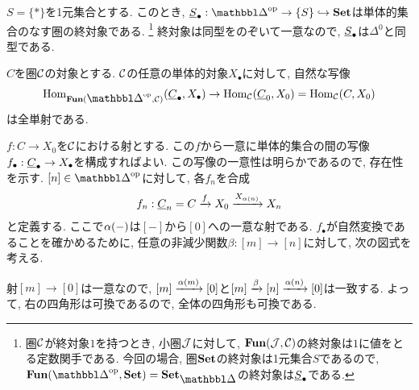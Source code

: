 \documentclass[uplatex, a4paper, 14Q, dvipdfmx]{jsreport}
\begin{document}
\begin{example}
  $S=\{\ast\}$を1元集合とする. 
  このとき, $\uline{S}_{\bullet}: \simop \to \{S\} \hookrightarrow \cset$は単体的集合のなす圏の終対象である.
  \footnote{
    圏$\mathcal{C}$が終対象$1$を持つとき, 小圏$\mathcal{J}$に対して, $\mathbf{Fun}(\mathcal{J},\mathcal{C})$の終対象は$1$に値をとる定数関手である. 
    今回の場合, 圏$\mathbf{Set}$の終対象は1元集合$S$であるので, $\fun(\simop,\cset)=\sset$の終対象は$\uline{S}_{\bullet}$である. 
  } 
  終対象は同型をのぞいて一意なので, $\uline{S}_{\bullet}$は$\Delta^0$と同型である. 
\end{example}

\begin{prop}
  $C$を圏$\mathcal{C}$の対象とする. 
  $\mathcal{C}$の任意の単体的対象$X_{\bullet}$に対して, 自然な写像
  \begin{align*}
    \Hom_{\fun(\simop,\calC)}(\uline{C}_{\bullet},X_{\bullet}) \to \Hom_{\calC}(\uline{C}_0,X_0) = \Hom_{\calC}(C,X_0)
  \end{align*}
  は全単射である.  
\end{prop}

\begin{Proof}
  $f: C \to X_0$を$\mathcal{C}$における射とする. 
  この$f$から一意に単体的集合の間の写像$f_{\bullet}: \uline{C}_{\bullet} \to X_{\bullet}$を構成すればよい. 
  この写像の一意性は明らかであるので, 存在性を示す. 
  $[n] \in \simop$に対して, 各$f_n$を合成
  \begin{align*}
    f_n: \uline{C}_n = C \xr{f} X_0 \xr{X_{\al(n)}} X_n
  \end{align*}
  と定義する. 
  ここで$\alpha(-)$は$[-]$から$[0]$への一意な射である. 
  $f_\bullet$が自然変換であることを確かめるために, 任意の非減少関数$\beta: [m] \to [n]$に対して, 次の図式を考える. 
  \begin{center}
  \end{center}
    射$[m] \to [0]$は一意なので, $[m] \xrightarrow{\alpha(m)} [0]$と$[m] \xrightarrow{\beta} [n] \xrightarrow{\alpha(n)} [0]$は一致する. 
    よって, 右の四角形は可換であるので, 全体の四角形も可換である.  
\end{Proof}
\end{document}
